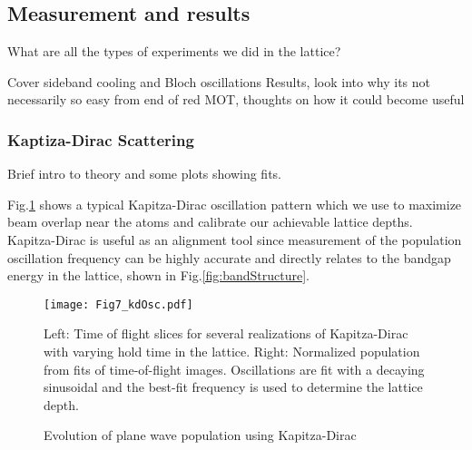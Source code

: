 \subsection{Measurement and results}
\label{ssec:lattice_tests}

What are all the types of experiments we did in the lattice?

Cover sideband cooling and Bloch oscillations
Results, look into why its not necessarily so easy from end of red MOT, thoughts on how it could become useful

\subsubsection{Kaptiza-Dirac Scattering}
\label{sssec:sideband_cooling}

Brief intro to theory and some plots showing fits.


Fig.\;\ref{fig:KDoscillations} shows a typical Kapitza-Dirac oscillation pattern which we use to maximize beam overlap near the atoms and calibrate our achievable lattice depths. Kapitza-Dirac is useful as an alignment tool since measurement of the population oscillation frequency can be highly accurate and directly relates to the bandgap energy in the lattice, shown in Fig.\;\ref{fig:bandStructure}. 


\begin{figure} \label{fig:KDoscillations}
	\texttt{[image: Fig7\_kdOsc.pdf]}
	\caption{Evolution of plane wave population using Kapitza-Dirac}{Left: Time of flight slices for several realizations of Kapitza-Dirac with varying hold time in the lattice. Right: Normalized population from fits of time-of-flight images. Oscillations are fit with a decaying sinusoidal and the best-fit frequency is used to determine the lattice depth.}
\end{figure}
	
